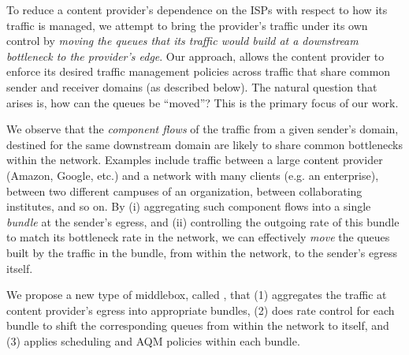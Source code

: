 To reduce a content provider's dependence on the ISPs with respect to how its traffic is managed, we attempt to bring the provider's traffic under its own control by \emph{moving the queues that its traffic would build at a downstream bottleneck to the provider's edge}. Our approach, allows the content provider to enforce its desired traffic management policies across traffic that share common sender and receiver domains (as described below). The natural question that arises is, how can the queues be ``moved''? This is the primary focus of our work. 

We observe that the \emph{component flows} of the traffic from a given sender's domain, destined for the same downstream domain are likely to share common bottlenecks within the network. Examples include traffic between a large content provider (\eg Amazon, Google, etc.) and a network with many clients (e.g. an enterprise), between two different campuses of an organization, between collaborating institutes, and so on. By (i) aggregating such component flows into a single \emph{bundle} at the sender's egress, and (ii) controlling the outgoing rate of this bundle to match its bottleneck rate in the network, we can effectively \emph{move} the queues built by the traffic in the bundle, from within the network, to the sender's egress itself. 

We propose a new type of middlebox, called \name, that (1) aggregates the traffic at content provider's egress into appropriate bundles, (2) does rate control for each bundle to shift the corresponding queues from within the network to itself, and (3) applies scheduling and AQM policies within each bundle. 

